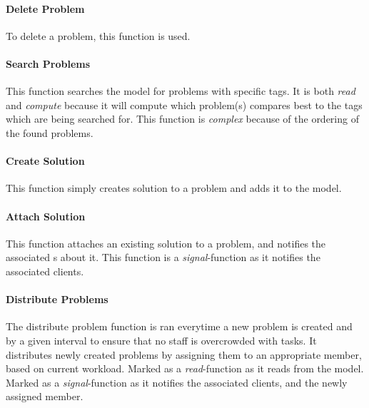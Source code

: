 \paragraph{Delete Problem} To delete a problem, this function is used.

\paragraph{Search Problems} 
This function searches the model for problems with specific tags. It is both \textit{read} and \textit{compute} because it will compute which problem(s) compares best to the tags which are being searched for. This function is \textit{complex} because of the ordering of the found problems.

\paragraph{Create Solution} This function simply creates solution to a problem and adds it to the model. 

\paragraph{Attach Solution} This function attaches an existing solution to a problem, and notifies the associated \client s about it. This function is a \textit{signal}-function as it notifies the associated clients. 

\paragraph{Distribute Problems} The distribute problem function is ran everytime a new problem is created and by a given interval to ensure that no staff is overcrowded with tasks. 
It distributes newly created problems by assigning them to an appropriate \astaff[] member, based on current workload. %
Marked as a \textit{read}-function as it reads from the model. Marked as a \textit{signal}-function as it notifies the associated clients, and the newly assigned \astaff[] member. 


